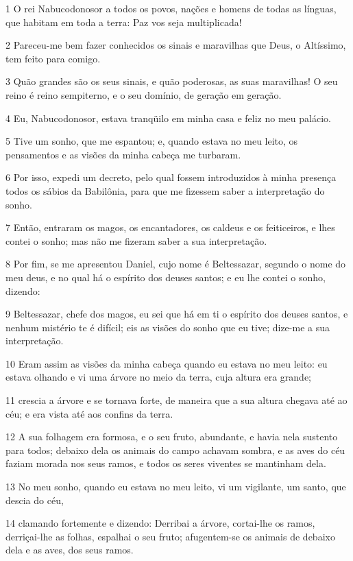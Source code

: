 \par 1 O rei Nabucodonosor a todos os povos, nações e homens de todas as línguas, que habitam em toda a terra: Paz vos seja multiplicada!
\par 2 Pareceu-me bem fazer conhecidos os sinais e maravilhas que Deus, o Altíssimo, tem feito para comigo.
\par 3 Quão grandes são os seus sinais, e quão poderosas, as suas maravilhas! O seu reino é reino sempiterno, e o seu domínio, de geração em geração.
\par 4 Eu, Nabucodonosor, estava tranqüilo em minha casa e feliz no meu palácio.
\par 5 Tive um sonho, que me espantou; e, quando estava no meu leito, os pensamentos e as visões da minha cabeça me turbaram.
\par 6 Por isso, expedi um decreto, pelo qual fossem introduzidos à minha presença todos os sábios da Babilônia, para que me fizessem saber a interpretação do sonho.
\par 7 Então, entraram os magos, os encantadores, os caldeus e os feiticeiros, e lhes contei o sonho; mas não me fizeram saber a sua interpretação.
\par 8 Por fim, se me apresentou Daniel, cujo nome é Beltessazar, segundo o nome do meu deus, e no qual há o espírito dos deuses santos; e eu lhe contei o sonho, dizendo:
\par 9 Beltessazar, chefe dos magos, eu sei que há em ti o espírito dos deuses santos, e nenhum mistério te é difícil; eis as visões do sonho que eu tive; dize-me a sua interpretação.
\par 10 Eram assim as visões da minha cabeça quando eu estava no meu leito: eu estava olhando e vi uma árvore no meio da terra, cuja altura era grande;
\par 11 crescia a árvore e se tornava forte, de maneira que a sua altura chegava até ao céu; e era vista até aos confins da terra.
\par 12 A sua folhagem era formosa, e o seu fruto, abundante, e havia nela sustento para todos; debaixo dela os animais do campo achavam sombra, e as aves do céu faziam morada nos seus ramos, e todos os seres viventes se mantinham dela.
\par 13 No meu sonho, quando eu estava no meu leito, vi um vigilante, um santo, que descia do céu,
\par 14 clamando fortemente e dizendo: Derribai a árvore, cortai-lhe os ramos, derriçai-lhe as folhas, espalhai o seu fruto; afugentem-se os animais de debaixo dela e as aves, dos seus ramos.
